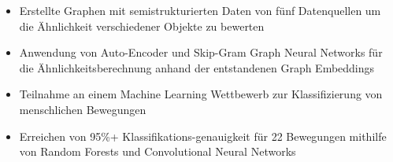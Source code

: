 
\begin{itemize}
    \item Erstellte Graphen mit semistrukturierten Daten von fünf Datenquellen um die Ähnlichkeit verschiedener Objekte zu bewerten
    \item Anwendung von Auto-Encoder und Skip-Gram Graph Neural Networks für die Ähnlichkeitsberechnung anhand der entstandenen Graph Embeddings
\end{itemize}

\divider

\begin{itemize}
    \item Teilnahme an einem Machine Learning Wettbewerb zur Klassifizierung von menschlichen Bewegungen %
    \item Erreichen von 95\%+ Klassifikations-genauigkeit für  22 Bewegungen mithilfe von Random Forests und Convolutional Neural Networks
\end{itemize}





